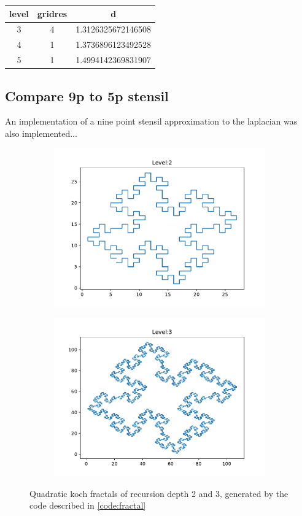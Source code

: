\documentclass{article}
\begin{document}
\begin{tabular}{ |c|c|c| }
    \hline
    level   &   gridres &   d\\
    \hline
    3   &   4   &   1.3126325672146508\\
    4   &   1   &   1.3736896123492528\\
    5   &   1   &   1.4994142369831907
    \label{table:idos}
\end{tabular}


\subsection{Compare 9p to 5p stensil}
An implementation of a nine point stensil approximation to the laplacian was also implemented...


\begin{figure}[H]
    \begin{subfigure}{0.5\textwidth}
        \includegraphics[width=\linewidth]{./media/quad_koch_level2.pdf}
    \end{subfigure}
    \begin{subfigure}{0.5\textwidth}
        \includegraphics[width=\linewidth]{./media/quad_koch_level3.pdf}
    \end{subfigure}
    \caption{Quadratic koch fractals of recursion depth 2 and 3, generated by the code described in \ref{code:fractal}}
\end{figure}
\end{document}
